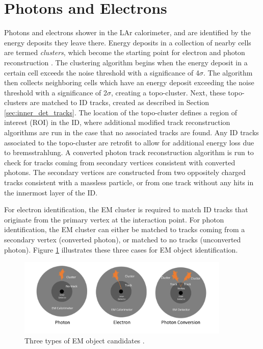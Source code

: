 \section{Photons and Electrons}
Photons and electrons shower in the LAr calorimeter, and are identified by the energy deposits they leave there. Energy deposits in a collection of nearby cells are termed \textit{clusters}, which become the starting point for electron and photon reconstruction \cite{electron_photon}. The clustering algorithm begins when the energy deposit in a certain cell exceeds the noise threshold with a significance of 4$\sigma$. The algorithm then collects neighboring cells which have an energy deposit exceeding the noise threshold with a significance of 2$\sigma$, creating a topo-cluster. Next, these topo-clusters are matched to ID tracks, created as described in Section \ref{sec:inner_det_tracks}. The location of the topo-cluster defines a region of interest (ROI) in the ID, where additional modified track reconstruction algorithms are run in the case that no associated tracks are found. Any ID tracks associated to the topo-cluster are retrofit to allow for additional energy loss due to bremsstrahlung. A converted photon track reconstruction algorithm is run to check for tracks coming from secondary vertices consistent with converted photons. The secondary vertices are constructed from two oppositely charged tracks consistent with a massless particle, or from one track without any hits in the innermost layer of the ID. \par

For electron identification, the EM cluster is required to match ID tracks that originate from the primary vertex at the interaction point. For photon identification, the EM cluster can either be matched to tracks coming from a secondary vertex (converted photon), or matched to no tracks (unconverted photon). Figure \ref{fig:electron_photon_id} illustrates these three cases for EM object identification. \par

\begin{figure}
        \centering
	\includegraphics[width=0.9\textwidth]{figures/ch5/electron_photon_id}
	\caption{Three types of EM object candidates \cite{electron_photon_id}. }
	\label{fig:electron_photon_id}
\end{figure}

